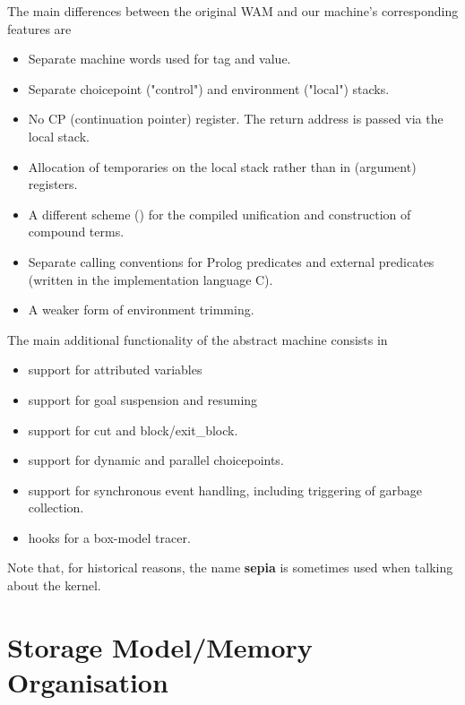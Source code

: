 The main differences between the original WAM and our machine's
corresponding features are
\begin{itemize}
\item Separate machine words used for tag and value.
\item Separate choicepoint ("control") and environment ("local") stacks.
\item No CP (continuation pointer) register. The return address
        is passed via the local stack.
\item Allocation of temporaries on the local stack rather than in
        (argument) registers.
\item A different scheme (\cite{compnd}) for the compiled
        unification and construction of compound terms.
\item Separate calling conventions for Prolog predicates and external
        predicates (written in the implementation language C).
\item A weaker form of environment trimming.
\end{itemize}
The main additional functionality of the {\eclipse} abstract machine
consists in
\begin{itemize}
\item support for attributed variables
\item support for goal suspension and resuming
\item support for cut and block/exit_block.
\item support for dynamic and parallel choicepoints.
\item support for synchronous event handling, including
        triggering of garbage collection.
\item hooks for a box-model tracer.
\end{itemize}
Note that, for historical reasons, the name {\bf sepia} is sometimes
used when talking about the {\eclipse} kernel.


\section{Storage Model/Memory Organisation}

